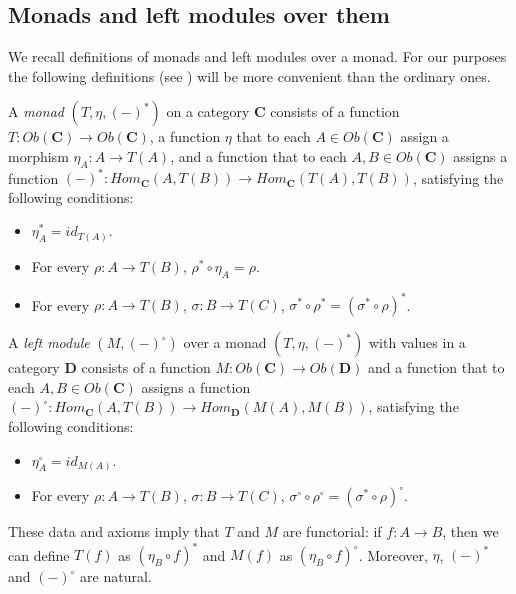 \documentclass[reqno]{amsart}
\theoremstyle{definition}
\theoremstyle{remark}
\newcommand{\cat}[1]{\mathbf{#1}}
\newcommand{\C}{\cat{C}}
\newcommand{\D}{\cat{D}}
\numberwithin{figure}{section}
\begin{document}
\subsection{Monads and left modules over them}

We recall definitions of monads and left modules over a monad.
For our purposes the following definitions (see \cite{manes-algebraic-theories}) will be more convenient than the ordinary ones.
\begin{defn}
A \emph{monad} $(T,\eta,(-)^*)$ on a category $\C$ consists of a function $T : Ob(\C) \to Ob(\C)$,
a function $\eta$ that to each $A \in Ob(\C)$ assign a morphism $\eta_A : A \to T(A)$,
and a function that to each $A,B \in Ob(\C)$ assigns a function $(-)^* : Hom_\C(A,T(B)) \to Hom_\C(T(A),T(B))$, satisfying the following conditions:
\begin{itemize}
\item $\eta_A^* = id_{T(A)}$.
\item For every $\rho : A \to T(B)$, $\rho^* \circ \eta_A = \rho$.
\item For every $\rho : A \to T(B)$, $\sigma : B \to T(C)$, $\sigma^* \circ \rho^* = (\sigma^* \circ \rho)^*$.
\end{itemize}

A \emph{left module} $(M,(-)^\circ)$ over a monad $(T,\eta,(-)^*)$ with values in a category $\D$ consists of a function $M : Ob(\C) \to Ob(\D)$
and a function that to each $A,B \in Ob(\C)$ assigns a function $(-)^\circ : Hom_\C(A,T(B)) \to Hom_\D(M(A),M(B))$, satisfying the following conditions:
\begin{itemize}
\item $\eta_A^\circ = id_{M(A)}$.
\item For every $\rho : A \to T(B)$, $\sigma : B \to T(C)$, $\sigma^\circ \circ \rho^\circ = (\sigma^* \circ \rho)^\circ$.
\end{itemize}
\end{defn}
These data and axioms imply that $T$ and $M$ are functorial: if $f : A \to B$, then we can define $T(f)$ as $(\eta_B \circ f)^*$ and $M(f)$ as $(\eta_B \circ f)^\circ$.
Moreover, $\eta$, $(-)^*$ and $(-)^\circ$ are natural.
\end{document}
